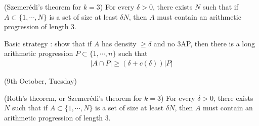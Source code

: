 \documentclass[12pt,a4paper]{report}
\begin{document}
(Szemer\'{e}di's theorem for $k=3$) For every $\delta >0$, there exists $N$ such that if $A \subset \{1, \cdots, N\}$ is a set of size at least $\delta N$, then $A$ must contain an arithmetic progression of length 3. 

\s

Basic strategy : show that if $A$ has density $\geq \delta$ and no 3AP, then there is a long arithmetic progression $P \subset \{1,\cdots,n\}$ such that
\begin{align*}
|A\cap P| \geq (\delta + c(\delta)) |P|
\end{align*}
\s

\newday

(9th October, Tuesday)
\s

(Roth's theorem, or Szemer\'{e}di's theorem for $k=3$) For every $\delta >0$, there exists $N$ such that if $A \subset \{1, \cdots, N\}$ is a set of size at least $\delta N$, then $A$ must contain an arithmetic progression of length 3. 
\s
\end{document}
